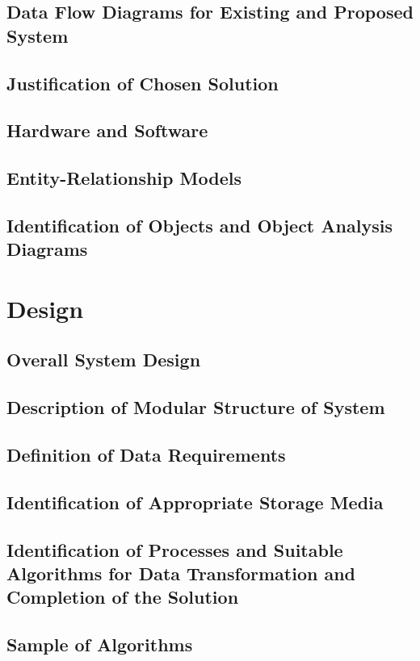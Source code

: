 \documentclass[11pt]{article}
\begin{document}
        \subsection{Data Flow Diagrams for Existing and Proposed System}
        \subsection{Justification of Chosen Solution}
        \subsection{Hardware and Software}
        \subsection{Entity-Relationship Models}
        \subsection{Identification of Objects and Object Analysis Diagrams}

    \section{Design}
        \subsection{Overall System Design}
        \subsection{Description of Modular Structure of System}
        \subsection{Definition of Data Requirements}
        \subsection{Identification of Appropriate Storage Media}
        \subsection{Identification of Processes and Suitable Algorithms for Data Transformation and Completion of the Solution}
        \subsection{Sample of Algorithms}
\end{document}
